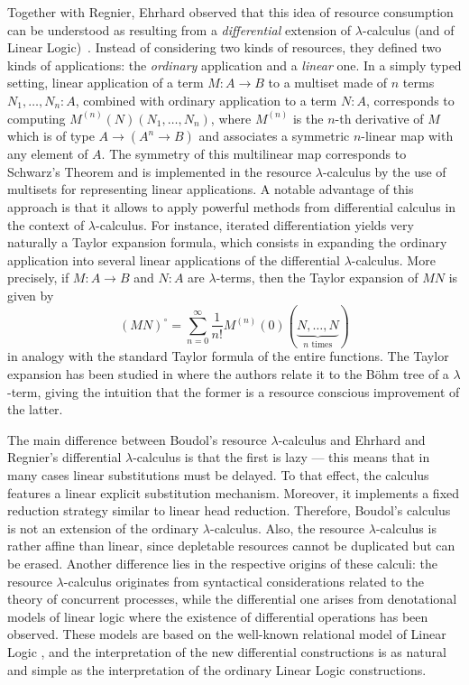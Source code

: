 \documentclass{LMCS}
\newcommand{\lam}{\ensuremath{\lambda}}
\newcommand{\TE}[1]{#1^{\circ}} \newcommand{\at}{\!::\!}
\begin{document}
Together with Regnier, Ehrhard observed that this idea of resource consumption can be
understood as resulting from a \emph{differential} extension of
$\lambda$-calculus (and of Linear Logic)~\cite{EhrhardR03}. 
Instead of considering two kinds of resources, they defined two kinds of applications: the \emph{ordinary} application and a \emph{linear} one.
In a simply typed setting, linear application of a term $M:A\to B$ to a multiset made of $n$ terms
$N_1,\dots,N_n:A$, combined with ordinary application to a term $N:A$,
corresponds to computing $M^{(n)}(N)(N_1,\dots,N_n)$, where $M^{(n)}$ is the
$n$-th derivative of $M$ which is of type $A\to(A^n\to B)$ and associates a
symmetric $n$-linear map with any element of $A$. The symmetry of this
multilinear map corresponds to Schwarz's Theorem and
is implemented in the resource $\lambda$-calculus by the use of multisets for
representing linear applications. 
A notable advantage of this approach is that it allows to apply powerful methods from differential calculus in the context of \lam-calculus.
For instance, iterated differentiation yields very naturally a Taylor expansion formula, which consists in expanding the ordinary application into
several linear applications of the differential \lam-calculus. 
More precisely, if $M : A\to B$ and $N : A$ are \lam-terms, then the Taylor expansion of $MN$ is given by
$$
	\TE{(MN)} =\sum_{n=0}^\infty \frac{1}{n!} M^{(n)}(0)(\underbrace{N,\dots,N}_{n\textrm{ times}})
$$
in analogy with the standard Taylor formula of the entire functions.
The Taylor expansion has been studied in \cite{EhrhardR08} where the authors relate it to the B\"ohm tree of a \lam-term, giving the intuition that the former is a resource conscious improvement of the latter.

The main difference between Boudol's resource $\lambda$-calculus and Ehrhard and Regnier's
differential $\lambda$-calculus is that the first is lazy --- this means that in many cases linear substitutions must be delayed. 
To that effect, the calculus features a linear explicit substitution mechanism. 
Moreover, it implements a fixed reduction strategy similar to linear head reduction.
Therefore, Boudol's calculus is not an extension of the ordinary 
\lam-calculus.
Also, the resource \lam-calculus is rather affine than linear, since depletable resources cannot be duplicated but can be erased.
Another difference lies in the respective origins of these calculi: 
the resource \lam-calculus originates from syntactical considerations related to the theory 
of concurrent processes, while the differential one arises from denotational models of linear logic where the existence of differential
operations has been observed. These models are based on the well-known relational model
of Linear Logic \cite{Girard88}, and the interpretation of the new differential constructions
is as natural and simple as the interpretation of the ordinary Linear Logic
constructions. 
\end{document}

